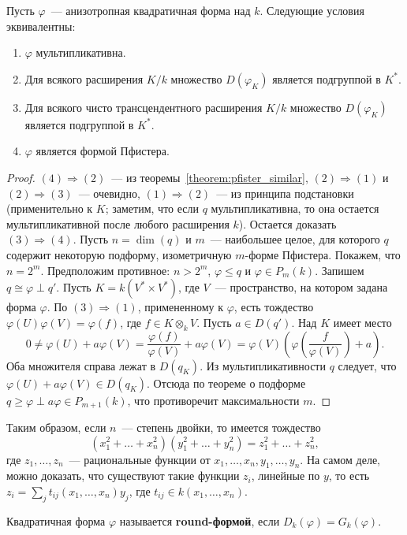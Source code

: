 \documentclass[a4paper,oneside,12pt]{article}
\theoremstyle{plain} { \swapnumbers
\newtheorem{theorem}{Теорема}[subsection]
\newtheorem{corollary}[theorem]{Следствие}
\newtheorem{lemma}[theorem]{Лемма}
\newtheorem{proposition}[theorem]{Утверждение}
\newtheorem{claim}[theorem]{Факт}
}
\theoremstyle{definition} { \swapnumbers
\newtheorem{definition}[theorem]{Определение}
\newtheorem{notation}[theorem]{Обозначение}
\newtheorem{remark}[theorem]{Замечание}
\newtheorem{remarks}[theorem]{Замечания}
\newtheorem{example}[theorem]{Пример}
\newtheorem{examples}[theorem]{Примеры}
\newtheorem{sssection}[theorem]{}
}
\def\ph{\varphi}
\begin{document}
\begin{theorem}
Пусть $\ph$~--- анизотропная квадратичная форма над $k$. Следующие условия эквивалентны:
\begin{enumerate}
\item $\ph$ мультипликативна.
\item Для всякого расширения $K/k$ множество $D(\ph_K)$ является подгруппой в $K^*$.
\item Для всякого чисто трансцендентного расширения $K/k$ множество $D(\ph_K)$ является подгруппой в $K^*$.
\item $\ph$ является формой Пфистера.
\end{enumerate}
\end{theorem}


\begin{proof}
$(4)\Rightarrow(2)$~--- из теоремы~\ref{theorem:pfister_similar}, $(2)\Rightarrow(1)$ и $(2)\Rightarrow(3)$~--- очевидно,
$(1)\Rightarrow(2)$~--- из принципа подстановки (применительно к $K$; заметим, что если $q$ мультипликативна, то она остается
мультипликативной после любого расширения $k$). Остается доказать $(3)\Rightarrow(4)$. Пусть $n=\dim(q)$ и $m$~--- наибольшее
целое, для которого $q$ содержит некоторую подформу, изометричную $m$-форме Пфистера. Покажем, что $n=2^m$. Предположим
противное: $n>2^m$, $\ph\leq q$ и $\ph\in P_m(k)$. Запишем $q\cong\ph\perp q'$. Пусть $K=k(V^*\times V^*)$, где $V$~--- пространство,
на котором задана форма $\ph$. По $(3)\Rightarrow(1)$, примененному к $\ph$, есть тождество
$\ph(U)\ph(V)=\ph(f)$, где $f\in K\otimes_kV$. Пусть $a\in D(q')$. Над $K$ имеет место
$$
0\neq\ph(U)+a\ph(V)=\frac{\ph(f)}{\ph(V)}+a\ph(V)=\ph(V)\left(\ph\left(\frac{f}{\ph(V)}\right)+a\right).
$$
Оба множителя справа лежат в $D(q_K)$. Из мультипликативности $q$ следует, что $\ph(U)+a\ph(V)\in D(q_K)$.
Отсюда по теореме о подформе $q\geq\ph\perp a\ph\in P_{m+1}(k)$, что противоречит максимальности $m$.
\end{proof}

Таким образом, если $n$~--- степень двойки, то имеется тождество
$$
(x_1^2+\dots+x_n^2)(y_1^2+\dots+y_n^2)=z_1^2+\dots+z_n^2,
$$
где $z_1,\dots,z_n$~--- рациональные функции от $x_1,\dots,x_n,y_1,\dots,y_n$. На самом деле,
можно доказать, что существуют такие функции $z_i$, линейные по $y$, то есть
$z_i=\sum_j t_{ij}(x_1,\dots,x_n)y_j$, где $t_{ij}\in k(x_1,\dots,x_n)$.

\begin{definition}
Квадратичная форма $\ph$ называется {\bf round-формой}, если $D_k(\ph)=G_k(\ph)$.
\end{definition}
\end{document}
